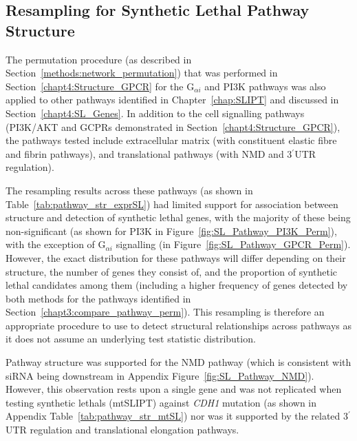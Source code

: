 \FloatBarrier

\subsection{Resampling for Synthetic Lethal Pathway Structure}  \label{chapt4:Structure_Perm}

The permutation procedure (as described in Section~\ref{methods:network_permutation}) that was performed in Section~\ref{chapt4:Structure_GPCR} for the G$_{\alpha i}$ and \gls{PI3K} \glspl{pathway} was also applied to other \glspl{pathway} identified in Chapter~\ref{chap:SLIPT} and discussed in Section~\ref{chapt4:SL_Genes}. In addition to the cell signalling \glspl{pathway} (PI3K/AKT and GCPRs demonstrated in Section~\ref{chapt4:Structure_GPCR}), the \glspl{pathway} tested include extracellular matrix (with constituent elastic fibre and fibrin \glspl{pathway}), and translational \glspl{pathway} (with \gls{NMD} and 3$^\prime$\gls{UTR} regulation).

The resampling results across these \glspl{pathway} (as shown in Table~\ref{tab:pathway_str_exprSL}) had limited support for association between  structure and detection of \gls{synthetic lethal} genes, with the majority of these being non-significant (as shown for \gls{PI3K} in Figure~\ref{fig:SL_Pathway_PI3K_Perm}), with the exception of G$_{\alpha i}$ signalling (in Figure~\ref{fig:SL_Pathway_GPCR_Perm}). However, the exact distribution for these \glspl{pathway} will differ depending on their structure, the number of genes they consist of, and the proportion of \gls{synthetic lethal} candidates among them (including a higher frequency of genes detected by both methods for the \glspl{pathway} identified in Section~\ref{chapt3:compare_pathway_perm}). This resampling is therefore an appropriate procedure to use to detect structural relationships across \glspl{pathway} as it does not assume an underlying test statistic distribution.

Pathway structure was supported for the \gls{NMD} \gls{pathway} (which is consistent with \gls{siRNA} being downstream in Appendix Figure~\ref{fig:SL_Pathway_NMD}). However, this observation rests upon a single gene and was not replicated when testing \glspl{synthetic lethal} (\acrshort{mtSLIPT}) against \textit{CDH1} \gls{mutation} (as shown in Appendix Table~\ref{tab:pathway_str_mtSL}) nor was it supported by the related 3$^\prime$\gls{UTR} regulation and translational elongation \glspl{pathway}.

